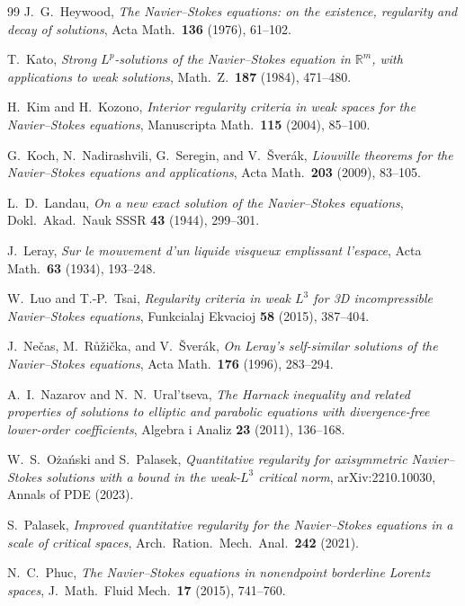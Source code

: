 \documentclass[11pt]{amsart}
\theoremstyle{definition}
\newcommand{\RR}{\mathbb{R}}
\begin{document}
\begin{thebibliography}{99}
J.~G.~Heywood,
\emph{The Navier--Stokes equations: on the existence, regularity and decay of solutions},
Acta Math.\ \textbf{136} (1976), 61--102.

T.~Kato,
\emph{Strong $L^p$-solutions of the Navier--Stokes equation in $\RR^m$, with applications to weak solutions},
Math.\ Z.\ \textbf{187} (1984), 471--480.

H.~Kim and H.~Kozono,
\emph{Interior regularity criteria in weak spaces for the Navier--Stokes equations},
Manuscripta Math.\ \textbf{115} (2004), 85--100.

G.~Koch, N.~Nadirashvili, G.~Seregin, and V.~\v{S}ver\'ak,
\emph{Liouville theorems for the Navier--Stokes equations and applications},
Acta Math.\ \textbf{203} (2009), 83--105.

L.~D.~Landau,
\emph{On a new exact solution of the Navier--Stokes equations},
Dokl.\ Akad.\ Nauk SSSR \textbf{43} (1944), 299--301.

J.~Leray,
\emph{Sur le mouvement d'un liquide visqueux emplissant l'espace},
Acta Math.\ \textbf{63} (1934), 193--248.

W.~Luo and T.-P.~Tsai,
\emph{Regularity criteria in weak $L^3$ for 3D incompressible Navier--Stokes equations},
Funkcialaj Ekvacioj \textbf{58} (2015), 387--404.

J.~Ne\v{c}as, M.~R\r{u}\v{z}i\v{c}ka, and V.~\v{S}ver\'ak,
\emph{On Leray's self-similar solutions of the Navier--Stokes equations},
Acta Math.\ \textbf{176} (1996), 283--294.

A.~I.~Nazarov and N.~N.~Ural'tseva,
\emph{The Harnack inequality and related properties of solutions to elliptic and parabolic equations with divergence-free lower-order coefficients},
Algebra i Analiz \textbf{23} (2011), 136--168.

W.~S.~O\.{z}a\'nski and S.~Palasek,
\emph{Quantitative regularity for axisymmetric Navier--Stokes solutions with a bound in the weak-$L^3$ critical norm},
arXiv:2210.10030, Annals of PDE (2023).

S.~Palasek,
\emph{Improved quantitative regularity for the Navier--Stokes equations in a scale of critical spaces},
Arch.\ Ration.\ Mech.\ Anal.\ \textbf{242} (2021).

N.~C.~Phuc,
\emph{The Navier--Stokes equations in nonendpoint borderline Lorentz spaces},
J.~Math.\ Fluid Mech.\ \textbf{17} (2015), 741--760.


\end{thebibliography}
\end{document}
